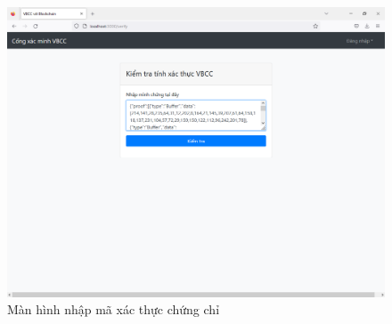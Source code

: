 \begin{figure}[htbp]
\centering
\includegraphics[width=.9\linewidth]{img/v_begin.PNG}
\caption{Màn hình nhập mã xác thực chứng chỉ}
\label{fig:v_begin}
\end{figure}


